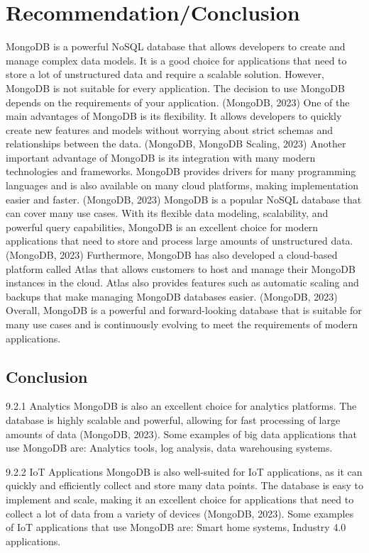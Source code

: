 
\section{Recommendation/Conclusion}

MongoDB is a powerful NoSQL database that allows developers to create and manage complex data 
models. It is a good choice for applications that need to store a lot of unstructured data and 
require a scalable solution. However, MongoDB is not suitable for every application. The decision 
to use MongoDB depends on the requirements of your application. (MongoDB, 2023)
One of the main advantages of MongoDB is its flexibility. It allows developers to quickly create 
new features and models without worrying about strict schemas and relationships between the data. 
(MongoDB, MongoDB Scaling, 2023)
Another important advantage of MongoDB is its integration with many modern technologies and 
frameworks. MongoDB provides drivers for many programming languages and is also available on many 
cloud platforms, making implementation easier and faster. (MongoDB, 2023)
MongoDB is a popular NoSQL database that can cover many use cases. With its flexible data 
modeling, scalability, and powerful query capabilities, MongoDB is an excellent choice for 
modern applications that need to store and process large amounts of unstructured data. 
(MongoDB, 2023)
Furthermore, MongoDB has also developed a cloud-based platform called Atlas that allows customers 
to host and manage their MongoDB instances in the cloud. Atlas also provides features such as 
automatic scaling and backups that make managing MongoDB databases easier. (MongoDB, 2023)
Overall, MongoDB is a powerful and forward-looking database that is suitable for many use cases 
and is continuously evolving to meet the requirements of modern applications.


\subsection{Conclusion}

9.2.1 Analytics
MongoDB is also an excellent choice for analytics platforms. The database is highly scalable 
and powerful, allowing for fast processing of large amounts of data (MongoDB, 2023). 
Some examples of big data applications that use MongoDB are:
Analytics tools, log analysis, data warehousing systems.

9.2.2 IoT Applications
MongoDB is also well-suited for IoT applications, as it can quickly and efficiently collect and 
store many data points. The database is easy to implement and scale, making it an excellent 
choice for applications that need to collect a lot of data from a variety of devices 
(MongoDB, 2023). Some examples of IoT applications that use MongoDB are:
Smart home systems, Industry 4.0 applications.


